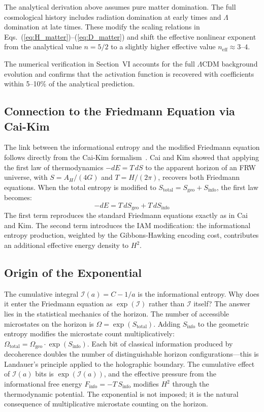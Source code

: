 \documentclass[twocolumn,superscriptaddress,prl,amsmath,amssymb]{revtex4-2}
\begin{document}
The analytical derivation above assumes pure matter domination. The full cosmological history includes radiation domination at early times and $\Lambda$ domination at late times. These modify the scaling relations in Eqs.~(\ref{eq:H_matter})--(\ref{eq:D_matter}) and shift the effective nonlinear exponent from the analytical value $n = 5/2$ to a slightly higher effective value $n_\text{eff} \approx 3$--$4$.

The numerical verification in Section~VI accounts for the full $\Lambda$CDM background evolution and confirms that the activation function is recovered with coefficients within 5--10\% of the analytical prediction.

\subsection{Connection to the Friedmann Equation via Cai-Kim}

The link between the informational entropy and the modified Friedmann equation follows directly from the Cai-Kim formalism~\cite{Cai2005}. Cai and Kim showed that applying the first law of thermodynamics $-dE = T\,dS$ to the apparent horizon of an FRW universe, with $S = A_H/(4G)$ and $T = H/(2\pi)$, recovers both Friedmann equations. When the total entropy is modified to $S_\text{total} = S_\text{geo} + S_\text{info}$, the first law becomes:
\begin{equation}
-dE = T\,dS_\text{geo} + T\,dS_\text{info}
\end{equation}
The first term reproduces the standard Friedmann equations exactly as in Cai and Kim. The second term introduces the IAM modification: the informational entropy production, weighted by the Gibbons-Hawking encoding cost, contributes an additional effective energy density to $H^2$.

\subsection{Origin of the Exponential}

The cumulative integral $\mathcal{I}(a) = C - 1/a$ is the informational entropy. Why does it enter the Friedmann equation as $\exp(\mathcal{I})$ rather than $\mathcal{I}$ itself? The answer lies in the statistical mechanics of the horizon. The number of accessible microstates on the horizon is $\Omega = \exp(S_\text{total})$. Adding $S_\text{info}$ to the geometric entropy modifies the microstate count multiplicatively: $\Omega_\text{total} = \Omega_\text{geo} \cdot \exp(S_\text{info})$. Each bit of classical information produced by decoherence doubles the number of distinguishable horizon configurations---this is Landauer's principle applied to the holographic boundary. The cumulative effect of $\mathcal{I}(a)$ bits is $\exp(\mathcal{I}(a))$, and the effective pressure from the informational free energy $F_\text{info} = -T\,S_\text{info}$ modifies $H^2$ through the thermodynamic potential. The exponential is not imposed; it is the natural consequence of multiplicative microstate counting on the horizon.
\end{document}
